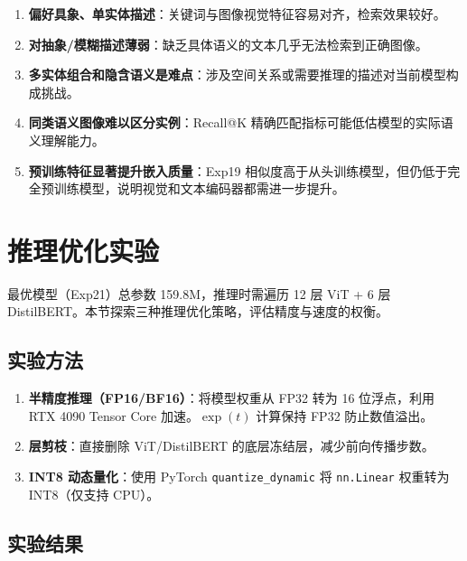 \documentclass[12pt,a4paper]{article}
\begin{document}
\begin{enumerate}
    \item \textbf{偏好具象、单实体描述}：关键词与图像视觉特征容易对齐，检索效果较好。
    \item \textbf{对抽象/模糊描述薄弱}：缺乏具体语义的文本几乎无法检索到正确图像。
    \item \textbf{多实体组合和隐含语义是难点}：涉及空间关系或需要推理的描述对当前模型构成挑战。
    \item \textbf{同类语义图像难以区分实例}：Recall@K 精确匹配指标可能低估模型的实际语义理解能力。
    \item \textbf{预训练特征显著提升嵌入质量}：Exp19 相似度高于从头训练模型，但仍低于完全预训练模型，说明视觉和文本编码器都需进一步提升。
\end{enumerate}

\section{推理优化实验}

最优模型（Exp21）总参数 159.8M，推理时需遍历 12 层 ViT + 6 层 DistilBERT。本节探索三种推理优化策略，评估精度与速度的权衡。

\subsection{实验方法}

\begin{enumerate}[nosep]
    \item \textbf{半精度推理（FP16/BF16）}：将模型权重从 FP32 转为 16 位浮点，利用 RTX 4090 Tensor Core 加速。$\exp(t)$ 计算保持 FP32 防止数值溢出。
    \item \textbf{层剪枝}：直接删除 ViT/DistilBERT 的底层冻结层，减少前向传播步数。
    \item \textbf{INT8 动态量化}：使用 PyTorch \texttt{quantize\_dynamic} 将 \texttt{nn.Linear} 权重转为 INT8（仅支持 CPU）。
\end{enumerate}

\subsection{实验结果}
\end{document}
